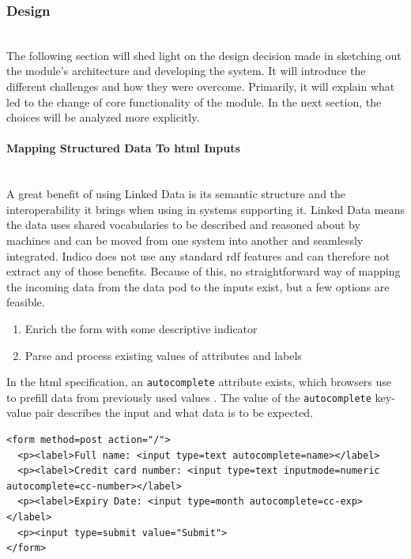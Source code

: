\subsubsection{Design}\label{poc2:design}\mbox{}\\

The following section will shed light on the design decision made in sketching out the module's architecture and developing the system. It will introduce the different challenges and how they were overcome. Primarily, it will explain what led to the change of core functionality of the module. In the next section, the choices will be analyzed more explicitly.
\vspace{0.5cm}
\paragraph{Mapping Structured Data To \gls{html} Inputs}\mbox{}\\

A great benefit of using Linked Data is its semantic structure and the interoperability it brings when using in systems supporting it. Linked Data means the data uses shared vocabularies to be described and reasoned about by machines and can be moved from one system into another and seamlessly integrated. Indico does not use any standard \gls{rdf} features and can therefore not extract any of those benefits. Because of this, no straightforward way of mapping the incoming data from the data pod to the inputs exist, but a few options are feasible.

\begin{enumerate}
    \item Enrich the form with some descriptive indicator
    \item Parse and process existing values of attributes and labels
\end{enumerate}

In the \gls{html} specification, an \texttt{autocomplete} attribute exists, which browsers use to prefill data from previously used values \cite{html-spec}. The value of the \texttt{autocomplete} key-value pair describes the input and what data is to be expected.

\begin{lstlisting}[language=Other,columns=fullflexible, caption={Autocomplete attribute on input field}, label={lst:autocomplete-input}]
<form method=post action="/">
  <p><label>Full name: <input type=text autocomplete=name></label>
  <p><label>Credit card number: <input type=text inputmode=numeric autocomplete=cc-number></label>
  <p><label>Expiry Date: <input type=month autocomplete=cc-exp></label>
  <p><input type=submit value="Submit">
</form>
\end{lstlisting}

